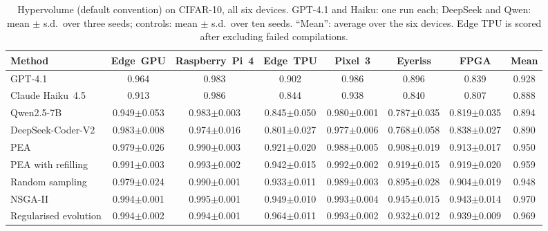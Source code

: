 \documentclass[preprint,12pt,authoryear]{elsarticle}
\begin{document}
\begin{table}[h]\centering\footnotesize
\caption{Hypervolume (default convention) on CIFAR-10, all six devices. GPT-4.1 and Haiku: one run each; DeepSeek and Qwen: mean $\pm$ s.d.\ over three seeds; controls: mean $\pm$ s.d.\ over ten seeds. ``Mean'': average over the six devices. Edge TPU is scored after excluding failed compilations.}\label{tab:multidevice}
\setlength{\tabcolsep}{2.5pt}
\begin{adjustbox}{max width=\linewidth}
\begin{tabular}{lccccccc}
\toprule
Method & Edge~GPU & Raspberry~Pi~4 & Edge~TPU & Pixel~3 & Eyeriss & FPGA & Mean \\
\midrule
GPT-4.1 & 0.964 & 0.983 & 0.902 & 0.986 & 0.896 & 0.839 & 0.928 \\
Claude Haiku~4.5 & 0.913 & 0.986 & 0.844 & 0.938 & 0.840 & 0.807 & 0.888 \\
Qwen2.5-7B & 0.949$\pm$0.053 & 0.983$\pm$0.003 & 0.845$\pm$0.050 & 0.980$\pm$0.001 & 0.787$\pm$0.035 & 0.819$\pm$0.035 & 0.894 \\
DeepSeek-Coder-V2 & 0.983$\pm$0.008 & 0.974$\pm$0.016 & 0.801$\pm$0.027 & 0.977$\pm$0.006 & 0.768$\pm$0.058 & 0.838$\pm$0.027 & 0.890 \\
\midrule
PEA & 0.979$\pm$0.026 & 0.990$\pm$0.003 & 0.921$\pm$0.020 & 0.988$\pm$0.005 & 0.908$\pm$0.019 & 0.913$\pm$0.017 & 0.950 \\
PEA with refilling & 0.991$\pm$0.003 & 0.993$\pm$0.002 & 0.942$\pm$0.015 & 0.992$\pm$0.002 & 0.919$\pm$0.015 & 0.919$\pm$0.020 & 0.959 \\
Random sampling & 0.979$\pm$0.024 & 0.990$\pm$0.001 & 0.933$\pm$0.011 & 0.989$\pm$0.003 & 0.895$\pm$0.028 & 0.904$\pm$0.019 & 0.948 \\
NSGA-II & 0.994$\pm$0.001 & 0.995$\pm$0.001 & 0.949$\pm$0.010 & 0.993$\pm$0.004 & 0.945$\pm$0.015 & 0.943$\pm$0.014 & 0.970 \\
Regularised evolution & 0.994$\pm$0.002 & 0.994$\pm$0.001 & 0.964$\pm$0.011 & 0.993$\pm$0.002 & 0.932$\pm$0.012 & 0.939$\pm$0.009 & 0.969 \\
\bottomrule
\end{tabular}
\end{adjustbox}
\end{table}
\end{document}
